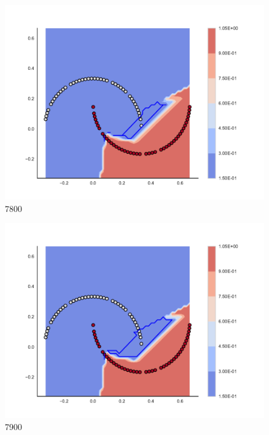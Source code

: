 \begin{subfigure}[b]{0.09\textwidth}
    \includegraphics[clip, trim=2.35cm 1.75cm 4.5cm 0cm,width=\textwidth]{img/convergence/7800.pdf}
    \caption{7800}
    \label{fig:convergence_7800}
\end{subfigure}
%
\begin{subfigure}[b]{0.09\textwidth}
    \includegraphics[clip, trim=2.35cm 1.75cm 4.5cm 0cm,width=\textwidth]{img/convergence/7900.pdf}
    \caption{7900}
    \label{fig:convergence_7900}
\end{subfigure}
%
